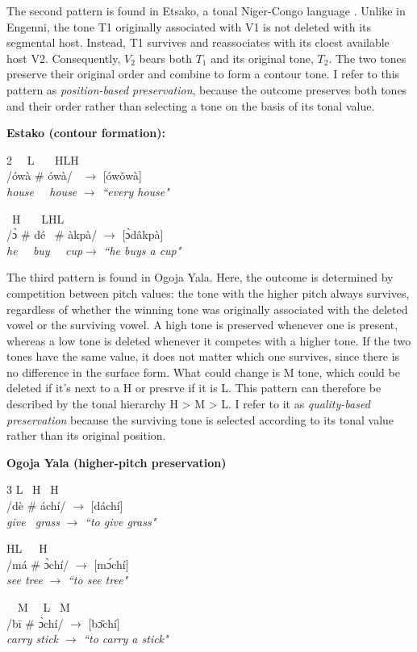The second pattern is found in Etsako, a tonal Niger-Congo language
\citep{elimelech1976}. Unlike in Engenni, the tone T1 originally
associated with V1 is not deleted with its segmental host.
Instead, T1 survives and reassociates with its cloest available host V2. 
Consequently, $V_2$ bears both $T_1$ and its original tone, $T_2$. 
The two tones preserve their original order and combine to form a contour 
tone. I refer to this pattern as \textit{position-based preservation}, 
because the outcome preserves both tones and their order rather than 
selecting a tone on the basis of its tonal value.

\ex \textbf{Estako (contour formation):} 

\begin{multicols}{2}
\quad\ \ L \ \ \ H\qquad\qquad LH\\
/ówà \# ówà/ \ $\rightarrow$ [ówǒwà] \\
\textit{house \ \ house} $\rightarrow$ \textit{``every house"}

\qquad\ H \ \ \ L\qquad\qquad HL\\
/\`ɔ \# dé \ \# àkpà/ $\rightarrow$ [\`ɔdâkpà] \\
\textit{he \ \ buy \ \ cup}\quad$\rightarrow$ \textit{``he buys a cup"}
\end{multicols}
\xe

The third pattern is found in Ogoja Yala. Here, the outcome is determined
by competition between pitch values: the tone with the higher pitch always
survives, regardless of whether the winning tone was originally associated
with the deleted vowel or the surviving vowel. A high tone is preserved
whenever one is present, whereas a low tone is deleted whenever it competes
with a higher tone. If the two tones have the same value, it does not matter
which one survives, since there is no difference in the surface form. What could change is M tone, which could be deleted if it's next to a H or presrve if it is L. This
pattern can therefore be described by the tonal hierarchy H > M > L. I
refer to it as \textit{quality-based preservation} because the surviving
tone is selected according to its tonal value rather than its original
position.


\ex \textbf{Ogoja Yala (higher-pitch preservation)}
\begin{multicols}{3}
\quad L \; \  H \qquad \quad \ H\\
/dè \# áchí/ $\rightarrow$ [dáchí]\\
\textit{give \ grass} $\rightarrow$ \textit{``to give grass"}

\quad H\quad L\qquad\ \ \ \quad H\\
/má \# \` ɔchí/ $\rightarrow$ [m\' ɔchí]\\
\vspace{1em}\textit{see \quad tree} $\rightarrow$ \textit{``to see tree"}

\ \ M \ \ L \qquad \quad \ M\\
/b\=i \# \` ɔchí/ $\rightarrow$ [b\=ɔchí]\\
\textit{carry  stick} $\rightarrow$ \textit{``to carry a stick"}
\end{multicols}
\xe

